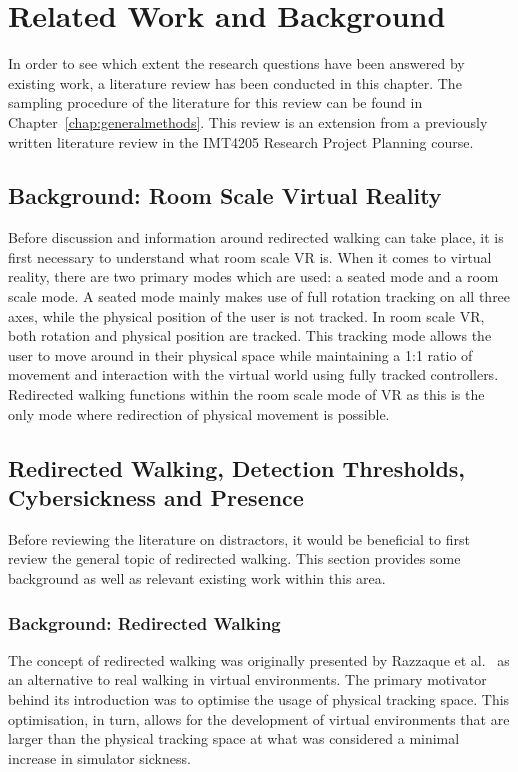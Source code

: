 \chapter{Related Work and Background}\label{chap:relatedWork}
In order to see which extent the research questions have been answered by existing work, a literature review has been conducted in this chapter. The sampling procedure of the literature for this review can be found in Chapter~\ref{chap:generalmethods}. This review is an extension from a previously written literature review in the IMT4205 Research Project Planning course. 

\section{Background: Room Scale Virtual Reality}
Before discussion and information around redirected walking can take place, it is first necessary to understand what room scale VR is. When it comes to virtual reality, there are two primary modes which are used: a seated mode and a room scale mode. A seated mode mainly makes use of full rotation tracking on all three axes, while the physical position of the user is not tracked. In room scale VR, both rotation and physical position are tracked. This tracking mode allows the user to move around in their physical space while maintaining a 1:1 ratio of movement and interaction with the virtual world using fully tracked controllers. Redirected walking functions within the room scale mode of VR as this is the only mode where redirection of physical movement is possible. 

\section{Redirected Walking, Detection Thresholds, Cybersickness and Presence}
Before reviewing the literature on distractors, it would be beneficial to first review the general topic of redirected walking. This section provides some background as well as relevant existing work within this area.

\subsection{Background: Redirected Walking}
The concept of redirected walking was originally presented by Razzaque et al.~\cite{razzaque2001redirected} as an alternative to real walking in virtual environments. The primary motivator behind its introduction was to optimise the usage of physical tracking space. This optimisation, in turn, allows for the development of virtual environments that are larger than the physical tracking space at what was considered a minimal increase in simulator sickness. 

